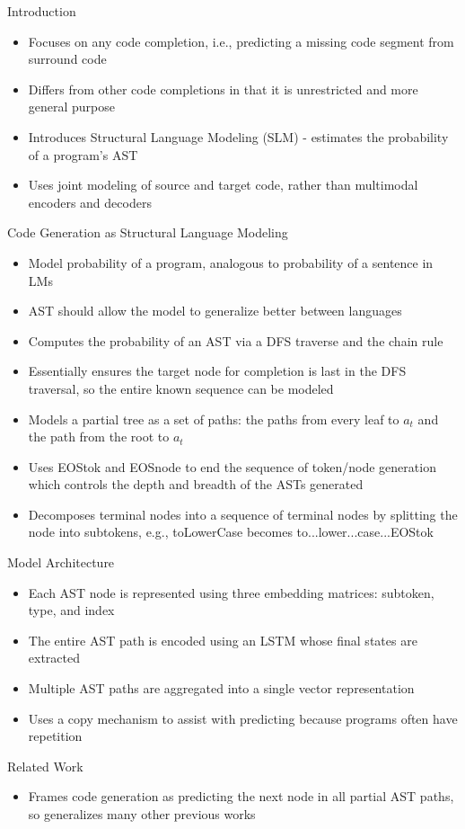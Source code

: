 \documentclass{article}
\begin{document}
Introduction
\begin{itemize}
	\item Focuses on any code completion, i.e., predicting a missing code segment from surround code
	\item Differs from other code completions in that it is unrestricted and more general purpose
	\item Introduces Structural Language Modeling (SLM) - estimates the probability of a program's AST
	\item Uses joint modeling of source and target code, rather than multimodal encoders and decoders
\end{itemize}
Code Generation as Structural Language Modeling
\begin{itemize}
	\item Model probability of a program, analogous to probability of a sentence in LMs
	\item AST should allow the model to generalize better between languages
	\item Computes the probability of an AST via a DFS traverse and the chain rule
	\item Essentially ensures the target node for completion is last in the DFS traversal, so the entire known sequence can be modeled
	\item Models a partial tree as a set of paths: the paths from every leaf to $a_t$ and the path from the root to $a_t$
	\item Uses EOStok and EOSnode to end the sequence of token/node generation which controls the depth and breadth of the ASTs generated
	\item Decomposes terminal nodes into a sequence of terminal nodes by splitting the node into subtokens, e.g., toLowerCase becomes to...lower...case...EOStok
\end{itemize}
Model Architecture
\begin{itemize}
	\item Each AST node is represented using three embedding matrices: subtoken, type, and index
	\item The entire AST path is encoded using an LSTM whose final states are extracted
	\item Multiple AST paths are aggregated into a single vector representation
	\item Uses a copy mechanism to assist with predicting because programs often have repetition
\end{itemize}
Related Work
\begin{itemize}
	\item Frames code generation as predicting the next node in all partial AST paths, so generalizes many other previous works
\end{itemize}
\end{document}
